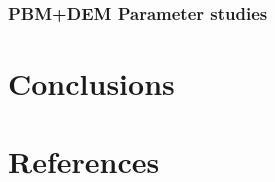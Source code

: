 \documentclass[preprint,11pt,authoryear]{elsarticle}
\begin{document}
\subsubsection{PBM+DEM Parameter studies}
%	    
\section{Conclusions}

\section*{References} 


\end{document}
